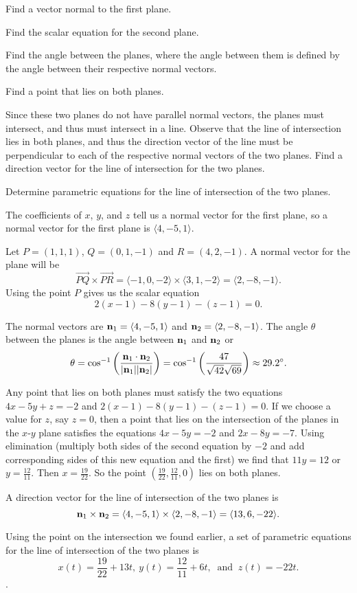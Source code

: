 \begin{exercises}
  \ba
  	\item  Find a vector normal to the first plane.
	\item  Find the scalar equation for the second plane.
	\item  Find the angle between the planes, where the angle between them is defined by the angle between their respective normal vectors.
	\item  Find a point that lies on both planes.
	\item  Since these two planes do not have parallel normal vectors, the planes must intersect, and thus must intersect in a line.  Observe that the line of intersection lies in both planes, and thus the direction vector of the line must be perpendicular to each of the respective normal vectors of the two planes.  Find a direction vector for the line of intersection for the two planes.
	\item  Determine parametric equations for the line of intersection of the two planes. 
  \ea

\begin{exerciseSolution}
  \ba
  	\item  The coefficients of $x$, $y$, and $z$ tell us a normal vector for the first plane, so a normal vector for the first plane is $\langle 4, -5, 1 \rangle$. 
	\item  Let $P = (1,1,1)$, $Q = (0,1,-1)$ and $R = (4,2,-1)$. A normal vector for the plane will be 
\[\overrightarrow{PQ} \times \overrightarrow{PR} = \langle -1,0,-2 \rangle \times \langle 3, 1, -2 \rangle = \langle 2, -8, -1 \rangle.\]
Using the point $P$ gives us the scalar equation 
\[2(x-1) - 8(y-1) - (z-1) = 0.\]
	\item  The normal vectors are $\mathbf{n}_1 = \langle 4, -5, 1 \rangle$ and $\mathbf{n}_2 = \langle 2, -8, -1 \rangle$. The angle $\theta$ between the planes is the angle between $\mathbf{n}_1$ and $\mathbf{n}_2$ or 
\[\theta = \cos^{-1}\left(\frac{\mathbf{n}_1 \cdot \mathbf{n}_2}{|\mathbf{n}_1| |\mathbf{n}_2|} \right) = \cos^{-1}\left(\frac{47}{\sqrt{42} \sqrt{69}} \right) \approx 29.2^{\circ}.\]
	\item  Any point that lies on both planes must satisfy the two equations $4x - 5y + z = -2$ and $2(x-1) - 8(y-1) - (z-1) = 0$. If we choose a value for $z$, say $z=0$, then a point that lies on the intersection of the planes in the $x$-$y$ plane satisfies the equations $4x-5y=-2$ and $2x-8y=-7$. Using elimination (multiply both sides of the second equation by $-2$ and add corresponding sides of this new equation and the first) we find that $11y = 12$ or $y = \frac{12}{11}$. Then $x = \frac{19}{22}$. So the point $\left(\frac{19}{22}, \frac{12}{11}, 0\right)$ lies on both planes.  
	\item  A direction vector for the line of intersection of the two planes is 
\[\mathbf{n}_1 \times \mathbf{n}_2 = \langle 4, -5, 1 \rangle \times \langle 2, -8, -1 \rangle = \langle 13, 6, -22 \rangle.\]
	\item  Using the point on the intersection we found earlier, a set of parametric equations for the line of intersection of the two planes is 
\[x(t) = \frac{19}{22} + 13t, \ y(t) = \frac{12}{11} +6t, \ \text{ and } \ z(t) = -22t.\]. 
  \ea
\end{exerciseSolution}


\end{exercises}

